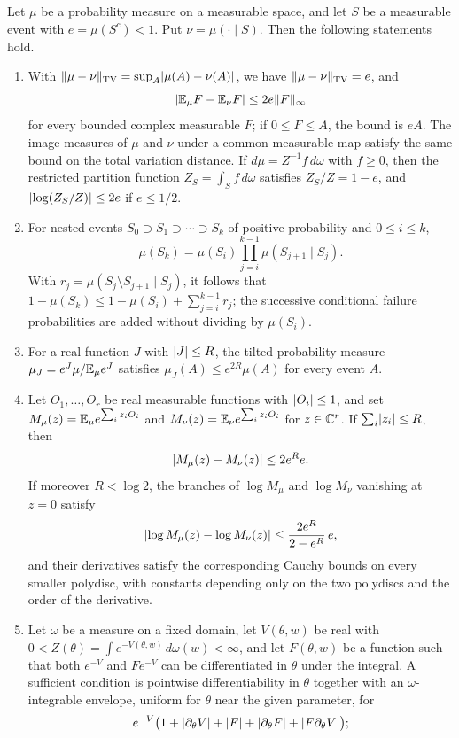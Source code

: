 \begin{lemma}\label{ch02:lem:bounded-transfer}
Let $\mu$ be a probability measure on a measurable space, and let $S$ be a measurable event with $e=\mu(S^c)<1$. Put $\nu=\mu(\cdot\mid S)$. Then the following statements hold.
\begin{enumerate}
\item With $\lVert \mu-\nu\rVert_{\operatorname{TV}}=\sup_A\lvert \mu(A)-\nu(A)\rvert$, we have $\lVert \mu-\nu\rVert_{\operatorname{TV}}=e$, and
\[
 \lvert \mathbb E_\mu F-\mathbb E_\nu F\rvert\le2e\lVert F\rVert_\infty
\]
for every bounded complex measurable $F$; if $0\le F\le A$, the bound is $eA$. The image measures of $\mu$ and $\nu$ under a common measurable map satisfy the same bound on the total variation distance. If $d\mu=Z^{-1}f\,d\omega$ with $f\ge0$, then the restricted partition function $Z_S=\int_Sf\,d\omega$ satisfies $Z_S/Z=1-e$, and $\lvert \log(Z_S/Z)\rvert\le2e$ if $e\le1/2$.
\item For nested events $S_0\supset S_1\supset\cdots\supset S_k$ of positive probability and $0\le i\le k$,
\[
 \mu(S_k)=\mu(S_i)\prod_{j=i}^{k-1}\mu(S_{j+1}\mid S_j).
\]
With $r_j=\mu(S_j\setminus S_{j+1}\mid S_j)$, it follows that $1-\mu(S_k)\le1-\mu(S_i)+\sum_{j=i}^{k-1}r_j$; the successive conditional failure probabilities are added without dividing by $\mu(S_i)$.
\item For a real function $J$ with $\lvert J\rvert\le R$, the tilted probability measure $\mu_J=e^J\mu/\mathbb E_\mu e^J$ satisfies $\mu_J(A)\le e^{2R}\mu(A)$ for every event $A$.
\item Let $O_1,\dots,O_r$ be real measurable functions with $\lvert O_i\rvert\le1$, and set $M_\mu(z)=\mathbb E_\mu e^{\sum_iz_iO_i}$ and $M_\nu(z)=\mathbb E_\nu e^{\sum_iz_iO_i}$ for $z\in\mathbb C^r$. If $\sum_i\lvert z_i\rvert\le R$, then
\[
 \lvert M_\mu(z)-M_\nu(z)\rvert\le2e^Re.
\]
If moreover $R<\log2$, the branches of $\log M_\mu$ and $\log M_\nu$ vanishing at $z=0$ satisfy
\[
 \lvert \log M_\mu(z)-\log M_\nu(z)\rvert\le\frac{2e^R}{2-e^R}\,e,
\]
and their derivatives satisfy the corresponding Cauchy bounds on every smaller polydisc, with constants depending only on the two polydiscs and the order of the derivative.
\item Let $\omega$ be a measure on a fixed domain, let $V(\theta,w)$ be real with $0<Z(\theta)=\int e^{-V(\theta,w)}\,d\omega(w)<\infty$, and let $F(\theta,w)$ be a function such that both $e^{-V}$ and $Fe^{-V}$ can be differentiated in $\theta$ under the integral. A sufficient condition is pointwise differentiability in $\theta$ together with an $\omega$-integrable envelope, uniform for $\theta$ near the given parameter, for
\[
 e^{-V}\bigl(1+\lvert \partial_\theta V\rvert+\lvert F\rvert+\lvert \partial_\theta F\rvert+\lvert F\partial_\theta V\rvert\bigr);
\]
\end{enumerate}
\end{lemma}
